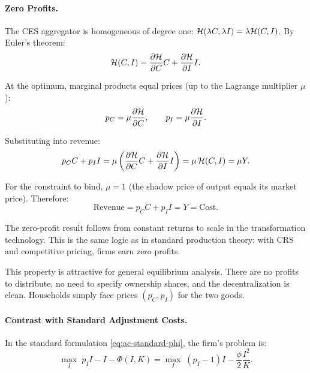 \paragraph{Zero Profits.}
The CES aggregator is homogeneous of degree one: $\mathcal{H}(\lambda C, \lambda I) = \lambda \mathcal{H}(C, I)$. By Euler's theorem:
\begin{equation}
\mathcal{H}(C, I) = \frac{\partial \mathcal{H}}{\partial C} C + \frac{\partial \mathcal{H}}{\partial I} I.
\label{eq:ac-euler-theorem}
\end{equation}

At the optimum, marginal products equal prices (up to the Lagrange multiplier $\mu$):
\begin{equation}
p_C = \mu \frac{\partial \mathcal{H}}{\partial C}, \qquad p_I = \mu \frac{\partial \mathcal{H}}{\partial I}.
\label{eq:ac-marginal-pricing}
\end{equation}

Substituting into revenue:
\begin{equation}
p_C C + p_I I = \mu \left( \frac{\partial \mathcal{H}}{\partial C} C + \frac{\partial \mathcal{H}}{\partial I} I \right) = \mu \, \mathcal{H}(C, I) = \mu Y.
\label{eq:ac-revenue}
\end{equation}

For the constraint to bind, $\mu = 1$ (the shadow price of output equals its market price). Therefore:
\begin{equation}
\boxed{\text{Revenue} = p_C C + p_I I = Y = \text{Cost}.}
\label{eq:ac-zero-profit}
\end{equation}

\begin{calloutimportant}
The zero-profit result follows from constant returns to scale in the transformation technology. This is the same logic as in standard production theory: with CRS and competitive pricing, firms earn zero profits.

This property is attractive for general equilibrium analysis. There are no profits to distribute, no need to specify ownership shares, and the decentralization is clean. Households simply face prices $(p_C, p_I)$ for the two goods.
\end{calloutimportant}

\paragraph{Contrast with Standard Adjustment Costs.}
In the standard formulation \cref{eq:ac-standard-phi}, the firm's problem is:
\begin{equation}
\max_{I} \; p_I I - I - \Phi(I, K) = \max_{I} \; (p_I - 1) I - \frac{\phi}{2} \frac{I^2}{K}.
\label{eq:ac-standard-firm}
\end{equation}

